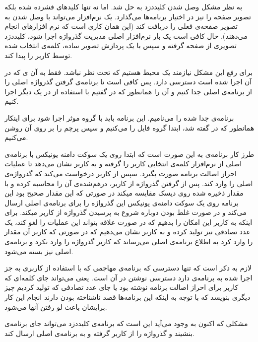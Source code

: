 به نظر مشکل وصل شدن کلیددزد به  حل شد. اما  نه تنها کلید‌های فشرده شده بلکه تصویر صفحه را نیز در اختیار برنامه‌ها می‌گذارد. یک نرم‌افزار می‌تواند با وصل شدن به  تصویر صفحه‌ی فعلی را دریافت کند (این همان کاری است که نرم افزارهای  انجام می‌دهند). حال کافی است یک بار نرم‌افزار اصلی مدیریت گذرواژه اجرا شود، کلیددزد تصویری از صفحه گرفته و سپس با یک پردازش تصویر ساده، کلمه‌ی انتخاب شده توسط کاربر را پیدا کند.

برای رفع این مشکل نیازمند یک محیط هستیم که تحت نظر  نباشد.  فقط به آن ی که در آن اجرا شده است دسترسی دارد. پس کافی است تا برنامه‌ی گرفتن گذرواژه اصلی را از برنامه‌ی اصلی جدا کنیم و آن را همانطور که در  گفتیم با استفاده از  در یک  دیگر اجرا کنیم. 

برنامه‌ی جدا شده را  می‌نامیم. این برنامه باید با گروه موثر  اجرا شود برای اینکار همانطور که در  گفته شد، ابتدا گروه فایل را  می‌کنیم و سپس پرچم  را بر روی آن روشن می‌کنیم.

طرز کار برنامه‌ی  به این صورت است که ابتدا روی یک سوکت دامنه یونیکس با برنامه‌ی اصلی از نرم‌افزار  کلمه‌ی انتخابی کاربر را گرفته و به کاربر نشان می‌دهد تا عملیات احراز اصالت برنامه صورت بگیرد. سپس از کاربر درخواست می‌کند که گذرواژه‌ی اصلی را وارد کند. پس از گرفتن گذرواژه از کاربر، درهم‌شده‌ی آن را محاسبه کرده و با مقدار ذخیره شده روی دیسک مقایسه میکند در صورتی که این مقدار صحیح بود این برنامه روی یک سوکت دامنه‌ی یونیکس این گذرواژه را برای برنامه‌ی اصلی ارسال می‌کند و در صورت غلط بودن دوباره شروع به پرسیدن گذرواژه از کاربر میکند. برای اینکه به کاربر این امکان را بدهیم که در صورت علاقه بتواند این عملیات را لغو کند، یک عدد تصادفی نیز تولید کرده و به کاربر نشان می‌دهیم که در صورتی که کاربر آن مقدار را وارد کرد  به اطلاع برنامه‌ی اصلی می‌رساند که کاربر گذرواژه را وارد نکرد و برنامه‌ی اصلی نیز بسته می‌شود.

لازم به ذکر است که تنها دسترسی که برنامه‌ی مهاجمی که با استفاده از کاربری به جز  اجرا شده به  برنامه‌ی  دارد دسترسی نوشتن در آن است. یعنی می‌تواند جای کلمه‌ای که کاربر برای احراز اصالت برنامه نوشته بود یا جای عدد تصادفی که تولید کردیم چیز دیگری بنویسد که با توجه به اینکه این برنامه‌ها قصد ناشناخته بودن دارند انجام این کار برایشان باعث لو رفتن آنها می‌شود.

مشکلی که اکنون به وجود می‌آید این است که برنامه‌ی کلیددزد می‌تواند جای برنامه‌ی  بنشیند و گذرواژه را از کاربر گرفته و به برنامه‌ی اصلی ارسال کند. 

